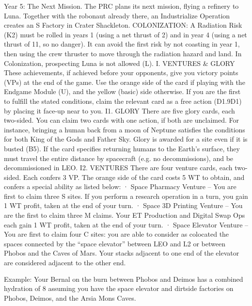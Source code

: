 \documentclass[a4paper]{book}
\begin{document}
Year 5: The Next Mission. The PRC plans its next mission, flying a refinery to Luna. Together with the robonaut already there, an Industrialize Operation creates an S Factory in Crater Shackleton.
COLONIZATION: A Radiation Risk (K2) must be rolled in years 1 (using a net thrust of 2) and in year 4 (using a net thrust of 11, so no danger). It can avoid the first risk by not coasting in year 1, then using the crew thruster to move through the radiation hazard and land. In Colonization, prospecting Luna is not allowed (L).
I. VENTURES \& GLORY
These achievements, if achieved before your opponents, give you victory points (VPs) at the end of the game. Use the orange side of the card if playing with the Endgame Module (U), and the yellow (basic) side otherwise. If you are the first to fulfill the stated conditions, claim the relevant card as a free action (D1.9D1) by placing it face-up near to you.
I1. GLORY
There are five glory cards, each two-sided.
You can claim two cards with one action, if both are unclaimed. For instance, bringing a human back from a moon of Neptune satisfies the conditions for both King of the Gods and Father Sky.
Glory is awarded for a site even if it is busted (B5).
If the card specifies returning humans to the Earth’s surface, they must travel the entire distance by spacecraft (e.g. no decommissions), and be decommissioned in LEO.
I2. VENTURES
There are four venture cards, each two-sided. Each confers 3 VP. The orange side of the card costs 5 WT to obtain, and confers a special ability as listed below:
·       Space Pharmacy Venture – You are first to claim three S sites. If you perform a research operation in a turn, you gain 1 WT profit, taken at the end of your turn.
·       Space 3D Printing Venture – You are the first to claim three M claims. Your ET Production and Digital Swap Ops each gain 1 WT profit, taken at the end of your turn.
·       Space Elevator Venture – You are first to claim four C sites: you are able to consider as colocated the spaces connected by the “space elevator” between LEO and L2 or between Phobos and the Caves of Mars. Your stacks adjacent to one end of the elevator are considered adjacent to the other end.

Example: Your Bernal on the burn between Phobos and Deimos has a combined hydration of 8 assuming you have the space elevator and dirtside factories on Phobos, Deimos, and the Arsia Mons Caves.
\end{document}
